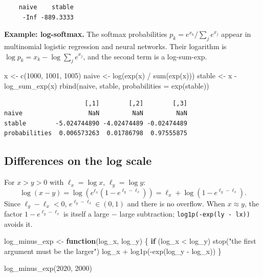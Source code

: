 \documentclass[
  letterpaper,
  DIV=11,
  numbers=noendperiod]{scrreprt}
\newenvironment{Shaded}{\begin{snugshade}}{\end{snugshade}}
\newcommand{\AttributeTok}[1]{\textcolor[rgb]{0.40,0.45,0.13}{#1}}
\newcommand{\ControlFlowTok}[1]{\textcolor[rgb]{0.00,0.23,0.31}{\textbf{#1}}}
\newcommand{\DecValTok}[1]{\textcolor[rgb]{0.68,0.00,0.00}{#1}}
\newcommand{\FunctionTok}[1]{\textcolor[rgb]{0.28,0.35,0.67}{#1}}
\newcommand{\NormalTok}[1]{\textcolor[rgb]{0.00,0.23,0.31}{#1}}
\newcommand{\OtherTok}[1]{\textcolor[rgb]{0.00,0.23,0.31}{#1}}
\newcommand{\SpecialCharTok}[1]{\textcolor[rgb]{0.37,0.37,0.37}{#1}}
\newcommand{\StringTok}[1]{\textcolor[rgb]{0.13,0.47,0.30}{#1}}
\begin{document}
\begin{verbatim}
    naive    stable 
     -Inf -889.3333 
\end{verbatim}

\textbf{Example: log-softmax.} The softmax probabilities
\(p_k = e^{x_k}/\sum_j e^{x_j}\) appear in multinomial logistic
regression and neural networks. Their logarithm is
\(\log p_k = x_k - \log\sum_j e^{x_j}\), and the second term is a
log-sum-exp.

\begin{Shaded}
\begin{Highlighting}[]
\NormalTok{x }\OtherTok{\textless{}{-}} \FunctionTok{c}\NormalTok{(}\DecValTok{1000}\NormalTok{, }\DecValTok{1001}\NormalTok{, }\DecValTok{1005}\NormalTok{)}
\NormalTok{naive }\OtherTok{\textless{}{-}} \FunctionTok{log}\NormalTok{(}\FunctionTok{exp}\NormalTok{(x) }\SpecialCharTok{/} \FunctionTok{sum}\NormalTok{(}\FunctionTok{exp}\NormalTok{(x)))}
\NormalTok{stable }\OtherTok{\textless{}{-}}\NormalTok{ x }\SpecialCharTok{{-}} \FunctionTok{log\_sum\_exp}\NormalTok{(x)}
\FunctionTok{rbind}\NormalTok{(naive, stable, }\AttributeTok{probabilities =} \FunctionTok{exp}\NormalTok{(stable))}
\end{Highlighting}
\end{Shaded}

\begin{verbatim}
                      [,1]        [,2]        [,3]
naive                  NaN         NaN         NaN
stable        -5.024744890 -4.02474489 -0.02474489
probabilities  0.006573263  0.01786798  0.97555875
\end{verbatim}

\subsection{Differences on the log
scale}\label{differences-on-the-log-scale}

For \(x > y > 0\) with \(\ell_x = \log x\), \(\ell_y = \log y\): \[
\log(x - y) = \log\left(e^{\ell_x}\left(1 - e^{\ell_y - \ell_x}\right)\right) = \ell_x + \log\left(1 - e^{\ell_y - \ell_x}\right).
\] Since \(\ell_y - \ell_x < 0\), \(e^{\ell_y-\ell_x}\in(0,1)\) and
there is no overflow. When \(x \approx y\), the factor
\(1 - e^{\ell_y-\ell_x}\) is itself a large − large subtraction;
\texttt{log1p(-exp(ly\ -\ lx))} avoids it.

\begin{Shaded}
\begin{Highlighting}[]
\NormalTok{log\_minus\_exp }\OtherTok{\textless{}{-}} \ControlFlowTok{function}\NormalTok{(log\_x, log\_y) \{}
  \ControlFlowTok{if}\NormalTok{ (log\_x }\SpecialCharTok{\textless{}}\NormalTok{ log\_y) }\FunctionTok{stop}\NormalTok{(}\StringTok{"the first argument must be the larger"}\NormalTok{)}
\NormalTok{  log\_x }\SpecialCharTok{+} \FunctionTok{log1p}\NormalTok{(}\SpecialCharTok{{-}}\FunctionTok{exp}\NormalTok{(log\_y }\SpecialCharTok{{-}}\NormalTok{ log\_x))}
\NormalTok{\}}

\FunctionTok{log\_minus\_exp}\NormalTok{(}\DecValTok{2020}\NormalTok{, }\DecValTok{2000}\NormalTok{)}
\end{Highlighting}
\end{Shaded}
\end{document}
